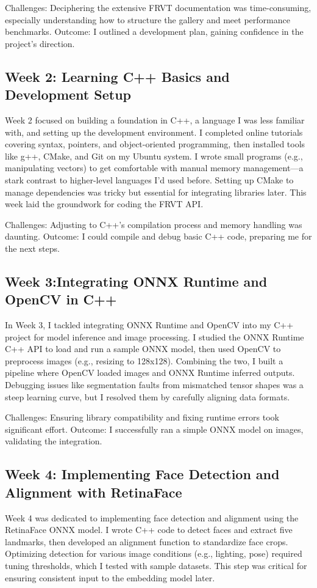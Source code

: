\documentclass[conference]{IEEEtran}
\begin{document}
Challenges: Deciphering the extensive FRVT documentation was time-consuming, especially understanding how to structure the gallery and meet performance benchmarks. Outcome: I outlined a development plan, gaining confidence in the project’s direction.
\subsection{Week 2: Learning C++ Basics and Development Setup}
Week 2 focused on building a foundation in C++, a language I was less familiar with, and setting up the development environment. I completed online tutorials covering syntax, pointers, and object-oriented programming, then installed tools like g++, CMake, and Git on my Ubuntu system. I wrote small programs (e.g., manipulating vectors) to get comfortable with manual memory management—a stark contrast to higher-level languages I’d used before. Setting up CMake to manage dependencies was tricky but essential for integrating libraries later. This week laid the groundwork for coding the FRVT API.

Challenges: Adjusting to C++’s compilation process and memory handling was daunting. Outcome: I could compile and debug basic C++ code, preparing me for the next steps.

\subsection{Week 3:Integrating ONNX Runtime and OpenCV in C++}
In Week 3, I tackled integrating ONNX Runtime and OpenCV into my C++ project for model inference and image processing. I studied the ONNX Runtime C++ API to load and run a sample ONNX model, then used OpenCV to preprocess images (e.g., resizing to 128x128). Combining the two, I built a pipeline where OpenCV loaded images and ONNX Runtime inferred outputs. Debugging issues like segmentation faults from mismatched tensor shapes was a steep learning curve, but I resolved them by carefully aligning data formats.

Challenges: Ensuring library compatibility and fixing runtime errors took significant effort. Outcome: I successfully ran a simple ONNX model on images, validating the integration.
\subsection{Week 4: Implementing Face Detection and Alignment with RetinaFace}
Week 4 was dedicated to implementing face detection and alignment using the RetinaFace ONNX model. I wrote C++ code to detect faces and extract five landmarks, then developed an alignment function to standardize face crops. Optimizing detection for various image conditions (e.g., lighting, pose) required tuning thresholds, which I tested with sample datasets. This step was critical for ensuring consistent input to the embedding model later.
\end{document}
